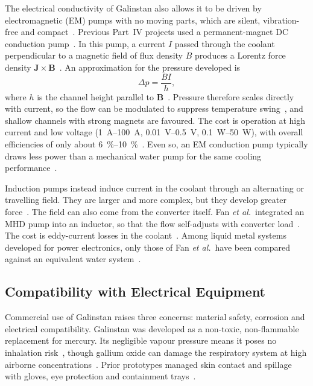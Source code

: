 The electrical conductivity of Galinstan also allows it to be driven by
electromagnetic (EM) pumps with no moving parts, which are silent,
vibration-free and compact~\cite{hodes_potential_2014}. Previous Part~IV
projects used a permanent-magnet DC conduction
pump~\cite{kwon_project_2025,loh_project_2025}. In this pump, a current $I$
passed through the coolant perpendicular to a magnetic field of flux density
$B$ produces a Lorentz force density
$\mathbf{J}\times\mathbf{B}$~\cite{kwon_project_2025}. An approximation for the
pressure developed is
\begin{equation}
  \Delta p = \frac{B I}{h},
  \label{eq:mhd-pressure}
\end{equation}
where $h$ is the channel height parallel to
$\mathbf{B}$~\cite{loh_project_2025}. Pressure therefore scales directly with
current, so the flow can be modulated to suppress temperature
swing~\cite{an_liquid_2024}, and shallow channels with strong magnets are
favoured. The cost is operation at high current and low voltage
(\SIrange{1}{100}{\ampere}, \SIrange{0.01}{0.5}{\volt},
\SIrange{0.1}{50}{\watt}), with overall efficiencies of only about
\SIrange{6}{10}{\percent}~\cite{an_liquid_2024,hodes_potential_2014}. Even
so, an EM conduction pump typically draws less power than a mechanical water pump
for the same cooling performance~\cite{an_liquid_2024, fan_liquid_2021, fan_high_2023, fan_ultra-efficient_2026}.

Induction pumps instead induce current in the coolant through an alternating or
travelling field. They are larger and more complex, but they develop greater
force~\cite{an_liquid_2024}. The field can also come from the converter itself.
Fan \emph{et al.}\ integrated an MHD pump into an inductor, so that the flow
self-adjusts with converter load~\cite{fan_liquid_2021}. The cost is
eddy-current losses in the coolant~\cite{fan_ultra-efficient_2026}. Among liquid metal
systems developed for power electronics, only those of Fan
\emph{et al.}\ have been compared against an equivalent water
system~\cite{fan_liquid_2021,fan_ultra-efficient_2026}.

\subsection{Compatibility with Electrical Equipment}
\label{sec:compatibility}

Commercial use of Galinstan raises three concerns: material safety, corrosion
and electrical compatibility. Galinstan was developed as a non-toxic,
non-flammable replacement for mercury. Its negligible vapour pressure means it
poses no inhalation risk~\cite{hodes_potential_2014}, though gallium oxide can damage
the respiratory system at high airborne concentrations~\cite{an_liquid_2024}. Prior prototypes managed
skin contact and spillage with gloves, eye protection and containment
trays~\cite{kwon_project_2025,loh_project_2025}.

